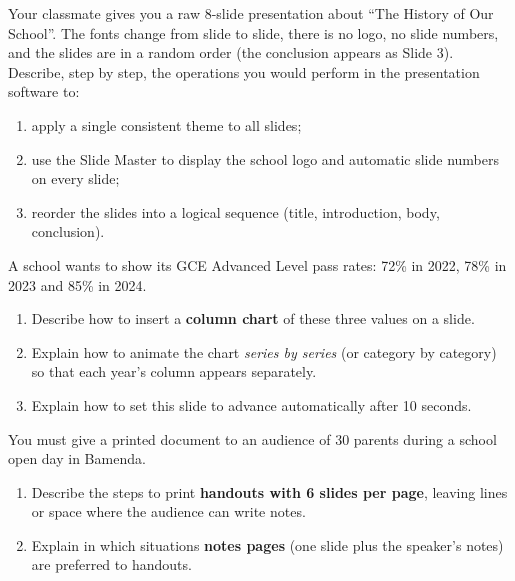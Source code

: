 \documentclass[11pt]{article}
\begin{document}
\begin{exercice}
Your classmate gives you a raw 8-slide presentation about ``The History of Our School''. The fonts change from slide to slide, there is no logo, no slide numbers, and the slides are in a random order (the conclusion appears as Slide 3). Describe, step by step, the operations you would perform in the presentation software to:
\begin{enumerate}
\item apply a single consistent theme to all slides;
\item use the Slide Master to display the school logo and automatic slide numbers on every slide;
\item reorder the slides into a logical sequence (title, introduction, body, conclusion).
\end{enumerate}
\end{exercice}

\begin{exercice}
A school wants to show its GCE Advanced Level pass rates: 72\% in 2022, 78\% in 2023 and 85\% in 2024.
\begin{enumerate}
\item Describe how to insert a \textbf{column chart} of these three values on a slide.
\item Explain how to animate the chart \emph{series by series} (or category by category) so that each year's column appears separately.
\item Explain how to set this slide to advance automatically after 10 seconds.
\end{enumerate}
\end{exercice}

\begin{exercice}
You must give a printed document to an audience of 30 parents during a school open day in Bamenda.
\begin{enumerate}
\item Describe the steps to print \textbf{handouts with 6 slides per page}, leaving lines or space where the audience can write notes.
\item Explain in which situations \textbf{notes pages} (one slide plus the speaker's notes) are preferred to handouts.
\end{enumerate}
\end{exercice}
\end{document}
